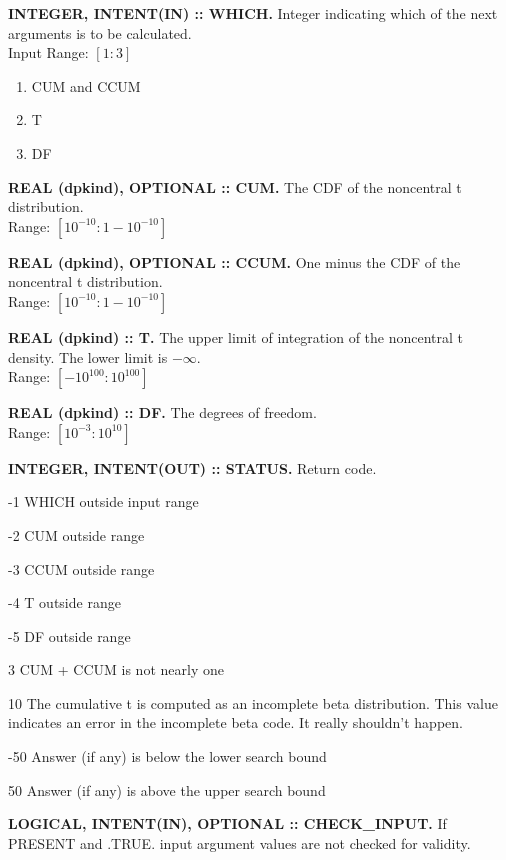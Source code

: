 \documentclass[12pt,dvips]{article}
\newcommand{\range}[2]{\hfill Range: \ensuremath{\left[ #1:#2
\right]}\\}
\newcommand{\inrange}[2]{\hfill Input Range: \ensuremath{\left[ #1:#2
\right]}\\}
\newcommand{\sdf}{10^{-3}}
\newcommand{\bdf}{10^{10}}
\newcommand{\sprob}{10^{-10}}
\newcommand{\bprob}{1-\sprob}
\newcommand{\immense}{10^{100}}
\newcommand{\myitem}[1]{\item{\bf \color{Violet} #1 \normalcolor}}
\begin{document}
\begin{description}

\myitem{INTEGER, INTENT(IN)  :: WHICH.} Integer indicating  which of the
next arguments is to be calculated.\\
\inrange{1}{3}
\begin{enumerate}
\item CUM and CCUM
\item T
\item DF
\end{enumerate}

\myitem{REAL  (dpkind), OPTIONAL ::  CUM.} The  CDF of  the  noncentral t
distribution.\\
\range{\sprob}{\bprob}

\myitem{REAL (dpkind), OPTIONAL :: CCUM.} One minus the CDF of the
noncentral t distribution.\\
\range{\sprob}{\bprob}

\myitem{REAL (dpkind)  :: T.}  The upper  limit of integration  of the
noncentral t
density.     The    lower    limit    is    $-\infty$.\\
\range{-\immense}{\immense}

\myitem{REAL (dpkind) :: DF.}  The degrees of
freedom.\\
\range{\sdf}{\bdf}

\myitem{INTEGER, INTENT(OUT) :: STATUS.} Return code.
\begin{description}
\item{-1}  WHICH outside input range
\item{-2}  CUM outside range
\item{-3}  CCUM outside range
\item{-4}  T outside range
\item{-5}  DF outside range
\item{3} CUM + CCUM is not nearly one
\item{10}  The cumulative t is computed as an incomplete
beta distribution.  This value indicates an error in the incomplete
beta code.  It really shouldn't happen.
\item{-50} Answer (if any) is below the lower search bound
\item{50} Answer (if any) is above the upper search bound
\end{description}

\myitem{LOGICAL, INTENT(IN), OPTIONAL :: CHECK\_INPUT.}  If PRESENT
and .TRUE. input argument values are not checked for validity.

\end{description}
\end{document}
